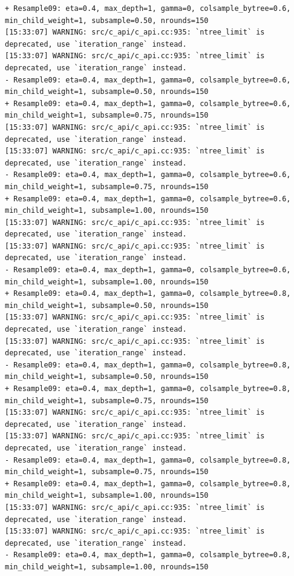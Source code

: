 \documentclass[
  letterpaper,
  DIV=11,
  numbers=noendperiod]{scrartcl}
\begin{document}
\begin{verbatim}
+ Resample09: eta=0.4, max_depth=1, gamma=0, colsample_bytree=0.6, min_child_weight=1, subsample=0.50, nrounds=150 
[15:33:07] WARNING: src/c_api/c_api.cc:935: `ntree_limit` is deprecated, use `iteration_range` instead.
[15:33:07] WARNING: src/c_api/c_api.cc:935: `ntree_limit` is deprecated, use `iteration_range` instead.
- Resample09: eta=0.4, max_depth=1, gamma=0, colsample_bytree=0.6, min_child_weight=1, subsample=0.50, nrounds=150 
+ Resample09: eta=0.4, max_depth=1, gamma=0, colsample_bytree=0.6, min_child_weight=1, subsample=0.75, nrounds=150 
[15:33:07] WARNING: src/c_api/c_api.cc:935: `ntree_limit` is deprecated, use `iteration_range` instead.
[15:33:07] WARNING: src/c_api/c_api.cc:935: `ntree_limit` is deprecated, use `iteration_range` instead.
- Resample09: eta=0.4, max_depth=1, gamma=0, colsample_bytree=0.6, min_child_weight=1, subsample=0.75, nrounds=150 
+ Resample09: eta=0.4, max_depth=1, gamma=0, colsample_bytree=0.6, min_child_weight=1, subsample=1.00, nrounds=150 
[15:33:07] WARNING: src/c_api/c_api.cc:935: `ntree_limit` is deprecated, use `iteration_range` instead.
[15:33:07] WARNING: src/c_api/c_api.cc:935: `ntree_limit` is deprecated, use `iteration_range` instead.
- Resample09: eta=0.4, max_depth=1, gamma=0, colsample_bytree=0.6, min_child_weight=1, subsample=1.00, nrounds=150 
+ Resample09: eta=0.4, max_depth=1, gamma=0, colsample_bytree=0.8, min_child_weight=1, subsample=0.50, nrounds=150 
[15:33:07] WARNING: src/c_api/c_api.cc:935: `ntree_limit` is deprecated, use `iteration_range` instead.
[15:33:07] WARNING: src/c_api/c_api.cc:935: `ntree_limit` is deprecated, use `iteration_range` instead.
- Resample09: eta=0.4, max_depth=1, gamma=0, colsample_bytree=0.8, min_child_weight=1, subsample=0.50, nrounds=150 
+ Resample09: eta=0.4, max_depth=1, gamma=0, colsample_bytree=0.8, min_child_weight=1, subsample=0.75, nrounds=150 
[15:33:07] WARNING: src/c_api/c_api.cc:935: `ntree_limit` is deprecated, use `iteration_range` instead.
[15:33:07] WARNING: src/c_api/c_api.cc:935: `ntree_limit` is deprecated, use `iteration_range` instead.
- Resample09: eta=0.4, max_depth=1, gamma=0, colsample_bytree=0.8, min_child_weight=1, subsample=0.75, nrounds=150 
+ Resample09: eta=0.4, max_depth=1, gamma=0, colsample_bytree=0.8, min_child_weight=1, subsample=1.00, nrounds=150 
[15:33:07] WARNING: src/c_api/c_api.cc:935: `ntree_limit` is deprecated, use `iteration_range` instead.
[15:33:07] WARNING: src/c_api/c_api.cc:935: `ntree_limit` is deprecated, use `iteration_range` instead.
- Resample09: eta=0.4, max_depth=1, gamma=0, colsample_bytree=0.8, min_child_weight=1, subsample=1.00, nrounds=150 

\end{verbatim}
\end{document}
